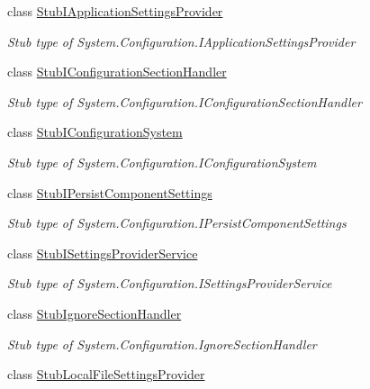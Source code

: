 \begin{DoxyCompactItemize}
class \hyperlink{class_system_1_1_configuration_1_1_fakes_1_1_stub_i_application_settings_provider}{Stub\-I\-Application\-Settings\-Provider}
\begin{DoxyCompactList}\small\item\em Stub type of System.\-Configuration.\-I\-Application\-Settings\-Provider\end{DoxyCompactList}\item 
class \hyperlink{class_system_1_1_configuration_1_1_fakes_1_1_stub_i_configuration_section_handler}{Stub\-I\-Configuration\-Section\-Handler}
\begin{DoxyCompactList}\small\item\em Stub type of System.\-Configuration.\-I\-Configuration\-Section\-Handler\end{DoxyCompactList}\item 
class \hyperlink{class_system_1_1_configuration_1_1_fakes_1_1_stub_i_configuration_system}{Stub\-I\-Configuration\-System}
\begin{DoxyCompactList}\small\item\em Stub type of System.\-Configuration.\-I\-Configuration\-System\end{DoxyCompactList}\item 
class \hyperlink{class_system_1_1_configuration_1_1_fakes_1_1_stub_i_persist_component_settings}{Stub\-I\-Persist\-Component\-Settings}
\begin{DoxyCompactList}\small\item\em Stub type of System.\-Configuration.\-I\-Persist\-Component\-Settings\end{DoxyCompactList}\item 
class \hyperlink{class_system_1_1_configuration_1_1_fakes_1_1_stub_i_settings_provider_service}{Stub\-I\-Settings\-Provider\-Service}
\begin{DoxyCompactList}\small\item\em Stub type of System.\-Configuration.\-I\-Settings\-Provider\-Service\end{DoxyCompactList}\item 
class \hyperlink{class_system_1_1_configuration_1_1_fakes_1_1_stub_ignore_section_handler}{Stub\-Ignore\-Section\-Handler}
\begin{DoxyCompactList}\small\item\em Stub type of System.\-Configuration.\-Ignore\-Section\-Handler\end{DoxyCompactList}\item 
class \hyperlink{class_system_1_1_configuration_1_1_fakes_1_1_stub_local_file_settings_provider}{Stub\-Local\-File\-Settings\-Provider}

\end{DoxyCompactItemize}
